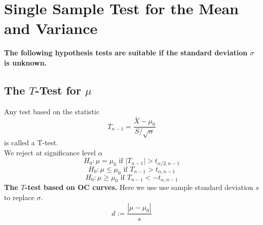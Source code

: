 \documentclass[a4paper,12pt]{article}
\begin{document}
\section{Single Sample Test for the Mean and Variance}
\textbf{The following hypothesis tests are suitable if the standard deviation $\sigma$ is unknown.}
\subsection{The $T$-Test for $\mu$}
Any test based on the statistic
\begin{equation}
T_{n-1}=\frac{\bar{X}-\mu_0}{S / \sqrt{n}}
\end{equation}
is called a T-test.\\
We reject at significance level $\alpha$
$$H_0: \mu=\mu_0 \text{ if } \left|T_{n-1}\right|>t_{\alpha / 2, n-1}$$
$$H_0: \mu \leq \mu_0 \text{ if } T_{n-1}>t_{\alpha, n-1}$$
$$H_0: \mu \geq \mu_0 \text{ if } T_{n-1}<-t_{\alpha, n-1}$$
\textbf{The $T$-test based on OC curves.} Here we use use sample standard deviation $s$ to replace $\sigma$. 
\begin{equation}
    d:=\dfrac{|\mu-\mu_0|}{s}
\end{equation}
\end{document}
